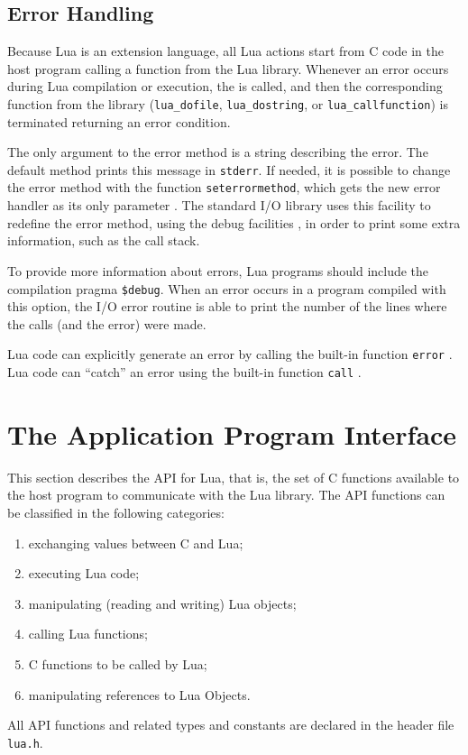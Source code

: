 \subsection{Error Handling} \label{error}

Because Lua is an extension language,
all Lua actions start from C code in the host program
calling a function from the Lua library.
Whenever an error occurs during Lua compilation or execution,
the  is called,
and then the corresponding function from the library
(\verb|lua_dofile|, \verb|lua_dostring|, or \verb|lua_callfunction|)
is terminated returning an error condition.

The only argument to the error method is a string
describing the error.
The default method prints this message in \verb|stderr|.
If needed, it is possible to change the error method with the
function \verb|seterrormethod|,
which gets the new error handler as its only parameter
.
The standard I/O library uses this facility to redefine the error method,
using the debug facilities ,
in order to print some extra information,
such as the call stack.

To provide more information about errors,
Lua programs should include the compilation pragma \verb|$debug|.
\label{pragma}
When an error occurs in a program compiled with this option,
the I/O error routine is able to print the number of the
lines where the calls (and the error) were made.

Lua code can explicitly generate an error by calling the built-in
function \verb|error| .
Lua code can ``catch'' an error using the built-in function
\verb|call| .



\section{The Application Program Interface}

This section describes the API for Lua, that is,
the set of C functions available to the host program to communicate
with the Lua library.
The API functions can be classified in the following categories:
\begin{enumerate}
\item exchanging values between C and Lua;
\item executing Lua code;
\item manipulating (reading and writing) Lua objects;
\item calling Lua functions;
\item C functions to be called by Lua;
\item manipulating references to Lua Objects.
\end{enumerate}
All API functions and related types and constants
are declared in the header file \verb|lua.h|.

